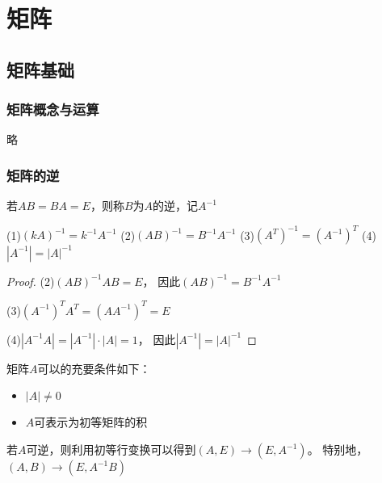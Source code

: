 


\chapter{矩阵}

\section{矩阵基础}

\subsection{矩阵概念与运算}

略

\subsection{矩阵的逆}


\begin{definition}[矩阵的逆]
  若$AB = BA = E$，则称$B$为$A$的逆，记$A^{-1}$
\end{definition}

\begin{theorem}[矩阵逆的基本性质]
  (1)$(kA)^{-1} = k^{-1}A^{-1}$
  (2)$(AB)^{-1} = B^{-1}A^{-1}$
  (3)$(A^T)^{-1} = (A^{-1})^T$
  (4)$|A^{-1}| = |A|^{-1}$
\end{theorem}

\begin{proof}
  (2)$(AB)^{-1}AB = E$，
  因此$(AB)^{-1} = B^{-1}A^{-1}$

  (3)$(A^{-1})^TA^T = (AA^{-1})^T = E$

  (4)$|A^{-1}A| = |A^{-1}| \cdot |A| = 1$，
  因此$|A^{-1}| = |A|^{-1}$
\end{proof}

\begin{theorem}[可逆充要条件]
  矩阵$A$可以的充要条件如下：
  \begin{itemize}
  \item $|A| \neq 0$
  \item $A$可表示为初等矩阵的积
  \end{itemize}
\end{theorem}


\begin{theorem}[利用初等行变换求逆]
  若$A$可逆，则利用初等行变换可以得到$(A,E) \rightarrow (E,A^{-1})$。
  特别地，$(A,B) \rightarrow (E, A^{-1}B)$
\end{theorem}

